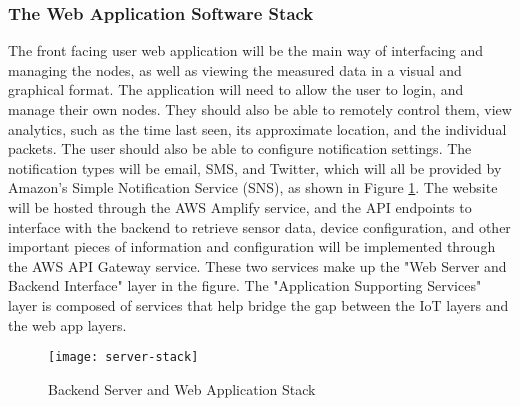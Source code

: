 \subsubsection{The Web Application Software Stack}
The front facing user web application will be the main way of interfacing and
managing the nodes, as well as viewing the measured data in a visual and
graphical format. The application will need to allow the user to login, and
manage their own nodes. They should also be able to remotely control them, view
analytics, such as the time last seen, its approximate location, and the
individual packets. The user should also be able to configure notification
settings. The notification types will be email, SMS, and Twitter, which will all
be provided by Amazon's Simple Notification Service (SNS), as shown in Figure
\ref{server-stack}. The website will be hosted through the AWS Amplify service,
and the API endpoints to interface with the backend to retrieve sensor data,
device configuration, and other important pieces of information and
configuration will be implemented through the AWS API Gateway service. These two
services make up the "Web Server and Backend Interface" layer in the figure. The
"Application Supporting Services" layer is composed of services that help bridge
the gap between the IoT layers and the web app layers. 


\begin{figure}
  \centering
  \texttt{[image: server-stack]}
  \caption{Backend Server and Web Application Stack}
  \label{server-stack}
\end{figure}
